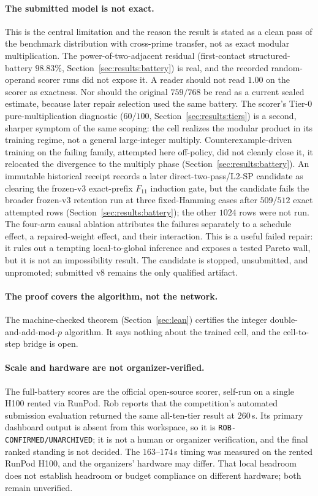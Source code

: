 \documentclass[11pt]{article}
\begin{document}
\paragraph{The submitted model is not exact.}
This is the central limitation and the reason the result is stated as a clean pass
of the benchmark distribution with cross-prime transfer, not as exact modular
multiplication. The power-of-two-adjacent residual (first-contact structured-battery $98.83\%$,
Section~\ref{sec:results:battery}) is real, and the recorded random-operand scorer
runs did not expose it.
A reader should not read $1.00$ on the scorer as exactness. Nor should the original
$759/768$ be read as a current sealed estimate, because later repair selection
used the same battery. The scorer's Tier-0
pure-multiplication diagnostic ($60/100$, Section~\ref{sec:results:tiers}) is a second,
sharper symptom of the same scoping: the cell realizes the modular product in its
training regime, not a general large-integer multiply. Counterexample-driven
training on the failing family, attempted here off-policy, did not cleanly close it,
it relocated the divergence to the multiply phase (Section~\ref{sec:results:battery}).
An immutable historical receipt records a later direct-two-pass/L2-SP candidate
as clearing the frozen-v3 exact-prefix $F_{11}$ induction gate, but the candidate
fails the broader frozen-v3 retention run at three
fixed-Hamming cases after $509/512$ exact attempted rows
(Section~\ref{sec:results:battery}); the other $1024$ rows were not run. The
four-arm causal ablation attributes the failures separately to a schedule effect,
a repaired-weight effect, and their interaction. This is a useful failed repair:
it rules out a tempting local-to-global inference and exposes a tested Pareto
wall, but it is not an impossibility result. The candidate is stopped, unsubmitted,
and unpromoted; submitted v8 remains the only qualified artifact.

\paragraph{The proof covers the algorithm, not the network.}
The machine-checked theorem (Section~\ref{sec:lean}) certifies the integer
double-and-add-mod-$p$ algorithm. It says nothing about the trained cell, and the
cell-to-step bridge is open.

\paragraph{Scale and hardware are not organizer-verified.}
The full-battery scores are the official open-source scorer, self-run on a single H100 rented via RunPod. Rob reports that the competition's automated submission evaluation returned the same
all-ten-tier result at $260$\,s. Its primary dashboard output is absent from this
workspace, so it is \texttt{ROB-CONFIRMED/UNARCHIVED}; it is not a human or organizer
verification, and the final ranked standing is not decided. The $163$--$174$\,s timing was measured on
the rented RunPod H100, and the organizers' hardware may differ. That local
headroom does not establish headroom or budget compliance on different hardware;
both remain unverified.
\end{document}
